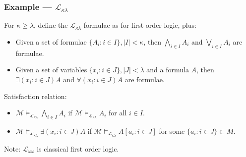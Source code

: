 \documentclass[UTF8,aspectratio=43,11pt,colorlinks,compress,openany]{beamer}%
\begin{document}
\begin{frame}\frametitle{Example --- $\mathcal{L}_{\kappa\lambda}$}
	For $\kappa\geq\lambda$, define the $\mathcal{L}_{\kappa\lambda}$ formulae as for first order logic, plus:
	\begin{itemize}
		\item Given a set of formulae $\{A_i: i\in I\}, |I|<\kappa$, then $\bigwedge\limits_{i\in I} A_i$ and $\bigvee\limits_{i\in I} A_i$ are formulae.
		\item Given a set of variables $\{x_i: i\in J\}, |J|<\lambda$ and a formula $A$, then $\exists(x_i: i\in J) A$ and $\forall(x_i: i\in J) A$ are formulae.
	\end{itemize}
	Satisfaction relation:
	\begin{itemize}
		\item $\mathcal{M}\vDash_{\mathcal{L}_{\kappa\lambda}}\bigwedge\limits_{i\in I} A_i$ if $\mathcal{M}\vDash_{\mathcal{L}_{\kappa\lambda}} A_i$ for all $i\in I$.
		\item $\mathcal{M}\vDash_{\mathcal{L}_{\kappa\lambda}}\exists(x_i: i\in J) A$ if $\mathcal{M}\vDash_{\mathcal{L}_{\kappa\lambda}} A[a_i: i\in J]$ for some $\{a_i: i\in J\}\subset M$.
	\end{itemize}
	Note: $\mathcal{L}_{\omega\omega}$ is classical first order logic.
\end{frame}
\end{document}
